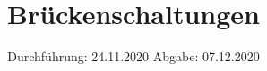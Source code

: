 

\subject{V302}
\title{Brückenschaltungen}
\date{%
  Durchführung: 24.11.2020
  \hspace{3em}
  Abgabe: 07.12.2020
}



\maketitle
\thispagestyle{empty}
\tableofcontents
\newpage







\printbibliography{}


